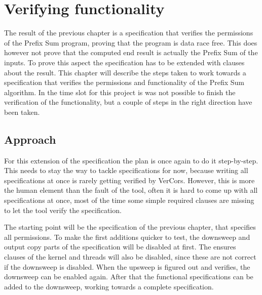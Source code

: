 \documentclass[a4paper]{article}
\begin{document}


\section{Verifying functionality}\label{chapter:verifyingFunctionality}
The result of the previous chapter is a specification that verifies the permissions of the Prefix Sum program, proving that the program is data race free. This does however not prove that the computed end result is actually the Prefix Sum of the inputs. To prove this aspect the specification has to be extended with clauses about the result. This chapter will describe the steps taken to work towards a specification that verifies the permissions and functionality of the Prefix Sum algorithm. In the time slot for this project is was not possible to finish the verification of the functionality, but a couple of steps in the right direction have been taken.

\subsection{Approach}
For this extension of the specification the plan is once again to do it step-by-step. This needs to stay the way to tackle specifications for now, because writing all specifications at once is rarely getting verified by VerCors. However, this is more the human element than the fault of the tool, often it is hard to come up with all specifications at once, most of the time some simple required clauses are missing to let the tool verify the specification.

The starting point will be the specification of the previous chapter, that specifies all permissions. To make the first additions quicker to test, the downsweep and output copy parts of the specification will be disabled at first. The ensures clauses of the kernel and threads will also be disabled, since these are not correct if the downsweep is disabled. When the upsweep is figured out and verifies, the downsweep can be enabled again. After that the functional specifications can be added to the downsweep, working towards a complete specification.
\end{document}
